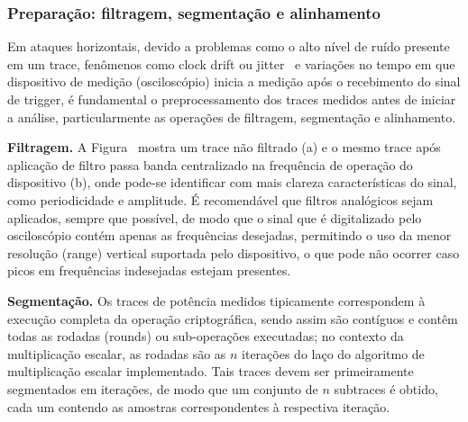 \subsubsection{Preparação: filtragem, segmentação e alinhamento}

Em ataques horizontais, devido a problemas como o alto nível de ruído presente em um trace, fenômenos como clock drift ou jitter~ e variações no tempo em que dispositivo de medição (osciloscópio) inicia a medição após o recebimento do sinal de trigger, é fundamental o preprocessamento dos traces medidos antes de iniciar a análise, particularmente as operações de filtragem, segmentação e alinhamento.

\noindent \textbf{Filtragem.} A Figura~ mostra um trace não filtrado (a) e o mesmo trace após aplicação de filtro passa banda centralizado na frequência de operação do dispositivo (b), onde pode-se identificar com mais clareza características do sinal, como periodicidade e amplitude. É recomendável que filtros analógicos sejam aplicados, sempre que possível, de modo que o sinal que é digitalizado pelo osciloscópio contém apenas as frequências desejadas, permitindo o uso da menor resolução (range) vertical suportada pelo dispositivo, o que pode não ocorrer caso picos em frequências indesejadas estejam presentes.

\noindent \textbf{Segmentação.} Os traces de potência medidos tipicamente correspondem à execução completa da operação criptográfica, sendo assim são contíguos e contêm todas as rodadas (rounds) ou sub-operações executadas; no contexto da multiplicação escalar, as rodadas são as $n$ iterações do laço do algoritmo de multiplicação escalar implementado. Tais traces devem ser primeiramente segmentados em iterações, de modo que um conjunto de $n$ subtraces é obtido, cada um contendo as amostras correspondentes à respectiva iteração.


